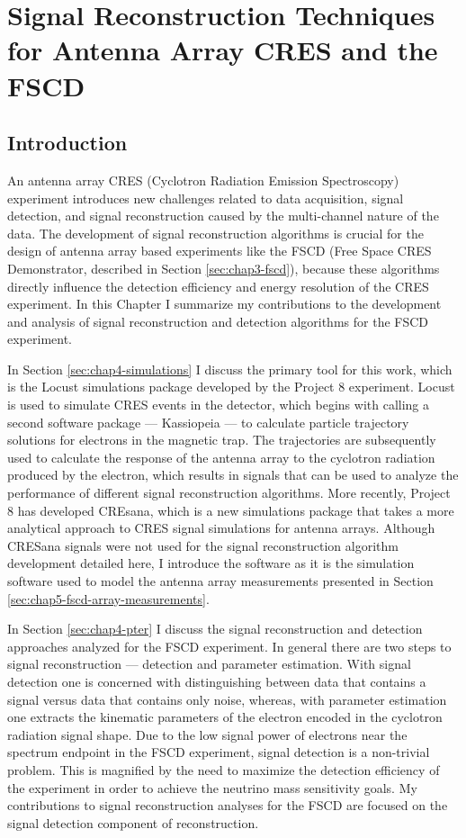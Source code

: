 \chapter{Signal Reconstruction Techniques for Antenna Array CRES and the FSCD}

\section{Introduction}

An antenna array CRES (Cyclotron Radiation Emission Spectroscopy) experiment introduces new challenges related to data acquisition, signal detection, and signal reconstruction caused by the multi-channel nature of the data. The development of signal reconstruction algorithms \cite{p8phase3trigger} is crucial for the design of antenna array based experiments like the FSCD (Free Space CRES Demonstrator, described in Section \ref{sec:chap3-fscd}), because these algorithms directly influence the detection efficiency and energy resolution of the CRES experiment. In this Chapter I summarize my contributions to the development and analysis of signal reconstruction and detection algorithms for the FSCD experiment.

In Section \ref{sec:chap4-simulations} I discuss the primary tool for this work, which is the Locust simulations package developed by the Project 8 experiment. Locust is used to simulate CRES events in the detector, which begins with calling a second software package --- Kassiopeia --- to calculate particle trajectory solutions for electrons in the magnetic trap. The trajectories are subsequently used to calculate the response of the antenna array to the cyclotron radiation produced by the electron, which results in signals that can be used to analyze the performance of different signal reconstruction algorithms. More recently, Project 8 has developed CREsana, which is a new simulations package that takes a more analytical approach to CRES signal simulations for antenna arrays. Although CRESana signals were not used for the signal reconstruction algorithm development detailed here, I introduce the software as it is the simulation software used to model the antenna array measurements presented in Section \ref{sec:chap5-fscd-array-measurements}.

In Section \ref{sec:chap4-pter} I discuss the signal reconstruction and detection approaches analyzed for the FSCD experiment. In general there are two steps to signal reconstruction --- detection and parameter estimation. With signal detection one is concerned with distinguishing between data that contains a signal versus data that contains only noise, whereas, with parameter estimation one extracts the kinematic parameters of the electron encoded in the cyclotron radiation signal shape. Due to the low signal power of electrons near the spectrum endpoint in the FSCD experiment, signal detection is a non-trivial problem. This is magnified by the need to maximize the detection efficiency of the experiment in order to achieve the neutrino mass sensitivity goals. My contributions to signal reconstruction analyses for the FSCD are focused on the signal detection component of reconstruction.

